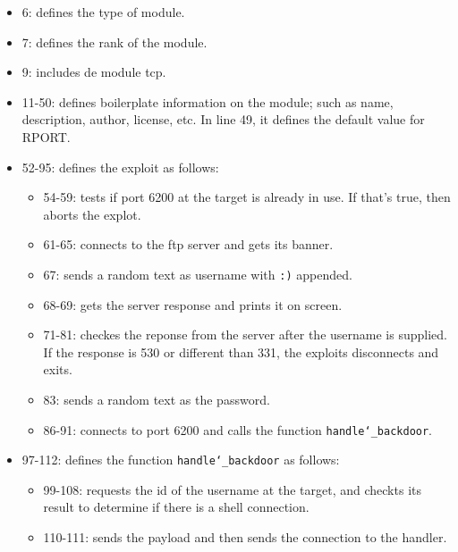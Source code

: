 \documentclass[twocolumn]{article}
\begin{document}
\begin{itemize}
    \item 6: defines the type of module.
    \item 7: defines the rank of the module.
    \item 9: includes de module tcp.
    \item 11-50: defines boilerplate information on the module; such as name, description, author, license, etc. In line 49, it defines the default value for RPORT.
    \item 52-95: defines the exploit as follows:
    \begin{itemize}
        \item 54-59: tests if port 6200 at the target is already in use. If that's true, then aborts the explot.
        \item 61-65: connects to the ftp server and gets its banner.
        \item 67: sends a random text as username with \texttt{:)} appended.
        \item 68-69: gets the server response and prints it on screen.
        \item 71-81: checkes the reponse from the server after the username is supplied. If the response is 530 or different than 331, the exploits disconnects and exits.
        \item 83: sends a random text as the password.
        \item 86-91: connects to port 6200 and calls the function \texttt{handle\char`\_backdoor}.
    \end{itemize}
    \item 97-112: defines the function \texttt{handle\char`\_backdoor} as follows:
    \begin{itemize}
        \item 99-108: requests the id of the username at the target, and checkts its result to determine if there is a shell connection.
        \item 110-111: sends the payload and then sends the connection to the handler.
    \end{itemize}
\end{itemize}
\end{document}
